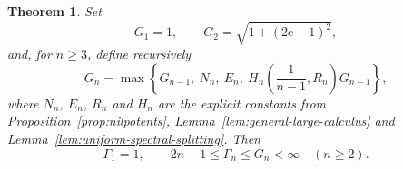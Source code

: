 \documentclass[a4paper]{amsart}
\newtheorem{theorem}{Theorem}[section]
\theoremstyle{remark}
\begin{document}
\begin{theorem}\label{thm:all-degrees}
Set
\[
       G_1=1,
       \qquad
       G_2=\sqrt{1+(2\mathrm e-1)^2},
\]
and, for \(n\geqslant3\), define recursively
\begin{equation}\label{eq:recursive-upper-bound}
       G_n=\max\left\{
       G_{n-1},\ N_n,\ E_n,\
       H_n\!\left(\frac1{n-1},R_n\right)G_{n-1}
       \right\},
\end{equation}
where \(N_n\), \(E_n\), \(R_n\) and \(H_n\) are the explicit constants
from Proposition~\ref{prop:nilpotents}, Lemma~\ref{lem:general-large-calculus}
and Lemma~\ref{lem:uniform-spectral-splitting}.  Then
\[
       \Gamma_1=1,
       \qquad
       2n-1\leqslant\Gamma_n\leqslant G_n<\infty
       \quad(n\geqslant2).
\]
\end{theorem}
\end{document}
